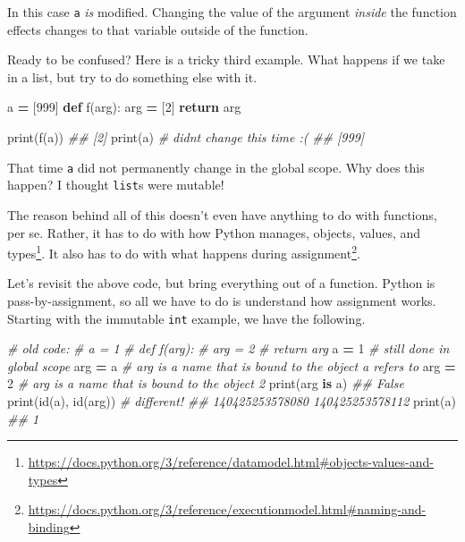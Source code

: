\documentclass[
  12pt,
  krantz2]{krantz}
\makeatletter
\newenvironment{Shaded}{\begin{snugshade}}{\end{snugshade}}
\newcommand{\BuiltInTok}[1]{#1}
\newcommand{\CommentTok}[1]{\textcolor[rgb]{0.37,0.37,0.37}{\textit{#1}}}
\newcommand{\ControlFlowTok}[1]{\textcolor[rgb]{0.27,0.27,0.27}{\textbf{#1}}}
\newcommand{\DecValTok}[1]{\textcolor[rgb]{0.06,0.06,0.06}{#1}}
\newcommand{\KeywordTok}[1]{\textcolor[rgb]{0.27,0.27,0.27}{\textbf{#1}}}
\newcommand{\NormalTok}[1]{#1}
\newcommand{\OperatorTok}[1]{\textcolor[rgb]{0.43,0.43,0.43}{\textbf{#1}}}
\renewcommand{\href}[2]{#2\footnote{\url{#1}}}
\newenvironment{kframe}{%
\medskip{}
\setlength{\fboxsep}{.8em}
 \def\at@end@of@kframe{}%
 \ifinner\ifhmode%
  \def\at@end@of@kframe{\end{minipage}}%
  \begin{minipage}{\columnwidth}%
 \fi\fi%
 \def\FrameCommand##1{\hskip\@totalleftmargin \hskip-\fboxsep
 \colorbox{shadecolor}{##1}\hskip-\fboxsep
     \hskip-\linewidth \hskip-\@totalleftmargin \hskip\columnwidth}%
 \MakeFramed {\advance\hsize-\width
   \@totalleftmargin\z@ \linewidth\hsize
   \@setminipage}}%
 {\par\unskip\endMakeFramed%
 \at@end@of@kframe}
\renewenvironment{Shaded}{\begin{kframe}}{\end{kframe}}
\makeatother
\begin{document}
In this case \texttt{a} \emph{is} modified. Changing the value of the argument \emph{inside} the function effects changes to that variable outside of the function.

Ready to be confused? Here is a tricky third example. What happens if we take in a list, but try to do something else with it.

\begin{Shaded}
\begin{Highlighting}[]
\NormalTok{a }\OperatorTok{=}\NormalTok{ [}\DecValTok{999}\NormalTok{]}
\KeywordTok{def}\NormalTok{ f(arg):}
\NormalTok{  arg }\OperatorTok{=}\NormalTok{ [}\DecValTok{2}\NormalTok{]}
  \ControlFlowTok{return}\NormalTok{ arg}

\BuiltInTok{print}\NormalTok{(f(a))}
\CommentTok{\#\# [2]}
\BuiltInTok{print}\NormalTok{(a) }\CommentTok{\# didn\textquotesingle{}t change this time :(}
\CommentTok{\#\# [999]}
\end{Highlighting}
\end{Shaded}

That time \texttt{a} did not permanently change in the global scope. Why does this happen? I thought \texttt{list}s were mutable!

The reason behind all of this doesn't even have anything to do with functions, per se. Rather, it has to do with how Python manages, \href{https://docs.python.org/3/reference/datamodel.html\#objects-values-and-types}{objects, values, and types}. It also has to do with what happens during \href{https://docs.python.org/3/reference/executionmodel.html\#naming-and-binding}{assignment}.

Let's revisit the above code, but bring everything out of a function. Python is pass-by-assignment, so all we have to do is understand how assignment works. Starting with the immutable \texttt{int} example, we have the following.

\begin{Shaded}
\begin{Highlighting}[]
\CommentTok{\# old code: }
\CommentTok{\# a = 1}
\CommentTok{\# def f(arg):}
\CommentTok{\#   arg = 2}
\CommentTok{\#   return arg}
\NormalTok{a }\OperatorTok{=} \DecValTok{1}    \CommentTok{\# still done in global scope}
\NormalTok{arg }\OperatorTok{=}\NormalTok{ a  }\CommentTok{\# arg is a name that is bound to the object a refers to}
\NormalTok{arg }\OperatorTok{=} \DecValTok{2}  \CommentTok{\# arg is a name that is bound to the object 2}
\BuiltInTok{print}\NormalTok{(arg }\KeywordTok{is}\NormalTok{ a)}
\CommentTok{\#\# False}
\BuiltInTok{print}\NormalTok{(}\BuiltInTok{id}\NormalTok{(a), }\BuiltInTok{id}\NormalTok{(arg)) }\CommentTok{\# different!\textasciigrave{}}
\CommentTok{\#\# 140425253578080 140425253578112}
\BuiltInTok{print}\NormalTok{(a)}
\CommentTok{\#\# 1}
\end{Highlighting}
\end{Shaded}
\end{document}
